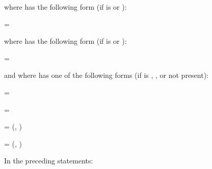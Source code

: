 \begin{fortranspecific}
where  has the following form (if 
is  or ):

\begin{indentedcodelist}
 = 
\end{indentedcodelist}

where  has the following form (if 
is  or ):

\begin{indentedcodelist}
 = 
\end{indentedcodelist}

and where  has one of the following forms (if 
 is , , or not present):

\begin{indentedcodelist}
 = 

 = 

 =  (, )

 =  (, )
\end{indentedcodelist}

In the preceding statements:


\end{fortranspecific}
